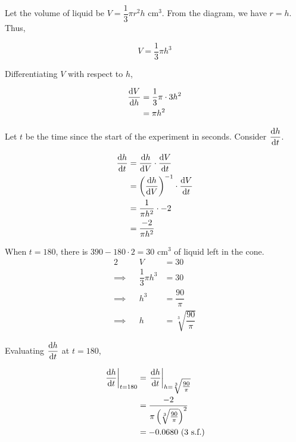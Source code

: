 \documentclass{echw}
\begin{document}
        Let the volume of liquid be $V = \dfrac13 \pi r^2 h$ cm$^3$. From the diagram, we have $r = h$. Thus,

        \begin{equation*}
            V = \dfrac13 \pi h^3
        \end{equation*}

        Differentiating $V$ with respect to $h$,

        \begin{align*}
            \dfrac{\mathrm{d} V}{\mathrm{d} h}&= \dfrac13 \pi \cdot 3 h^2\\
            &= \pi h^2
        \end{align*}

        Let $t$ be the time since the start of the experiment in seconds. Consider $\dfrac{\mathrm{d} h}{\mathrm{d} t}$.

        \begin{align*}
            \dfrac{\mathrm{d} h}{\mathrm{d} t} &= \dfrac{\mathrm{d} h}{\mathrm{d} V} \cdot \dfrac{\mathrm{d} V}{\mathrm{d} t}\\
            &= \left(\dfrac{\mathrm{d} h}{\mathrm{d} V}\right)^{-1} \cdot \dfrac{\mathrm{d} V}{\mathrm{d} t}\\
            &= \dfrac1{\pi h^2} \cdot -2\\
            &= \dfrac{-2}{\pi h^2}
        \end{align*}

        When $t = 180$, there is $390 - 180\cdot2 = 30$ cm$^3$ of liquid left in the cone.
        \begin{alignat*}{2}
            &&V &= 30\\
            \implies&&\dfrac13 \pi h^3 &= 30\\
            \implies&&h^3 &= \dfrac{90}{\pi}\\
            \implies&&h &= \sqrt[3]{\dfrac{90}{\pi}}
        \end{alignat*}

        Evaluating $\dfrac{\mathrm{d} h}{\mathrm{d} t}$ at $t =180$,

        \begin{align*}
            \left.\dfrac{\mathrm{d} h}{\mathrm{d} t}\right|_{t = 180} &= \left.\dfrac{\mathrm{d} h}{\mathrm{d} t}\right|_{h = \sqrt[3]{\tfrac{90}{\pi}}}\\
            &= \dfrac{-2}{\pi \left(\sqrt[3]{\tfrac{90}{\pi}}\right)^2}\\
            &= -0.0680 \text{ (3 s.f.)}
        \end{align*}

\end{document}
